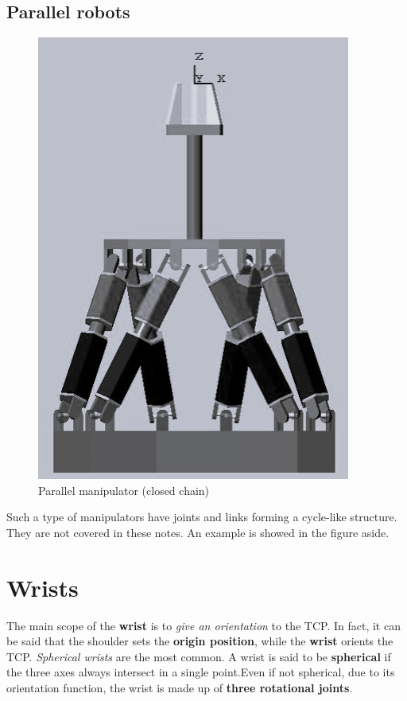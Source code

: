 \subsection{Parallel robots}
\begin{multicols}{2}
    \begin{figure}[H]
        \centering
        \includegraphics[scale=0.5]{img/parallel_man.png}
        \caption{Parallel manipulator (closed chain)}
    \end{figure}
    \noindent
    Such a type of manipulators have joints and links forming a cycle-like structure. They are not covered in these notes. An example is showed in the figure aside.
\end{multicols}

\section{Wrists}
The main scope of the \textbf{wrist} is to \textit{give an orientation} to the TCP. In fact, it can be said that the shoulder sets the \textbf{origin position}, while the \textbf{wrist} orients the TCP. \textit{Spherical wrists} are the most common. A wrist is said to be \textbf{spherical} if the three axes always intersect in a single point.Even if not spherical, due to its orientation function, the wrist is made up of \textbf{three rotational joints}.

